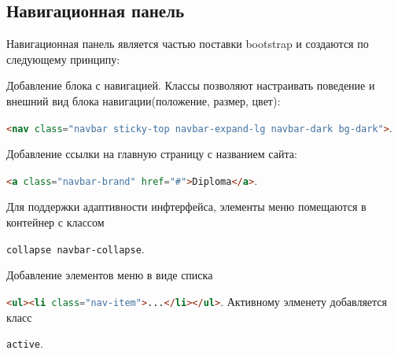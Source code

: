 \subsection{Навигационная панель}
Навигационная панель является частью поставки bootstrap и создаются по следующему принципу:
\begin{enumerated}
	\item Добавление блока с навигацией. Классы позволяют настраивать поведение и внешний вид блока навигации(положение, размер, цвет): \item \lstinline[language=HTML]{<nav class="navbar sticky-top navbar-expand-lg navbar-dark bg-dark">}.
	\item Добавление ссылки на главную страницу с названием сайта: \item \lstinline[language=HTML]{<a class="navbar-brand" href="#">Diploma</a>}.
	\item Для поддержки адаптивности инфтерфейса, элементы меню помещаются в контейнер с классом \item \lstinline[language=HTML]{collapse navbar-collapse}.
	\item Добавление элементов меню в виде списка \item \lstinline[language=HTML]{<ul><li class="nav-item">...</li></ul>}. Активному элменету добавляется класс \item \lstinline[language=HTML]{active}.
\end{enumerated}